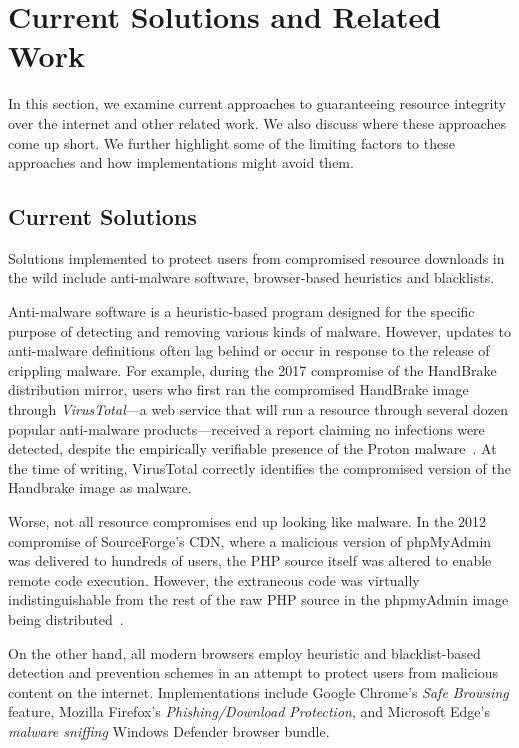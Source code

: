 \section{Current Solutions and Related Work} \label{sec:related}

In this section, we examine current approaches to guaranteeing resource
integrity over the internet and other related work. We also discuss where these
approaches come up short. We further highlight some of the limiting factors to
these approaches and how \SYSTEM{} implementations might avoid them.

\subsection{Current Solutions}

Solutions implemented to protect users from compromised resource downloads in
the wild include anti-malware software, browser-based heuristics and blacklists.

Anti-malware software is a heuristic-based program designed for the specific
purpose of detecting and removing various kinds of malware. However, updates to
anti-malware definitions often lag behind or occur in response to the release of
crippling malware. For example, during the 2017 compromise of the HandBrake
distribution mirror, users who first ran the compromised HandBrake image through
\textit{VirusTotal}---a web service that will run a resource through several
dozen popular anti-malware products---received a report claiming no infections
were detected, despite the empirically verifiable presence of the Proton
malware~\cite{SCA-HB1}. At the time of writing, VirusTotal correctly identifies
the compromised version of the Handbrake image as malware.

Worse, not all resource compromises end up looking like malware. In the 2012
compromise of SourceForge's CDN, where a malicious version of phpMyAdmin was
delivered to hundreds of users, the PHP source itself was altered to enable
remote code execution. However, the extraneous code was virtually
indistinguishable from the rest of the raw PHP source in the phpmyAdmin image
being distributed~\cite{SCA-PMA1}.

On the other hand, all modern browsers employ heuristic and blacklist-based
detection and prevention schemes in an attempt to protect users from malicious
content on the internet. Implementations include Google Chrome's \textit{Safe
Browsing} feature, Mozilla Firefox's \textit{Phishing/Download Protection}, and
Microsoft Edge's \textit{malware sniffing} Windows Defender browser bundle.

